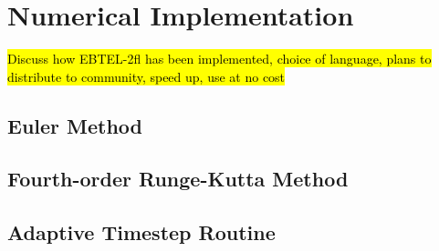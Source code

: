 \section{Numerical Implementation}
\label{sec:numerical}
%
\hl{Discuss how EBTEL-2fl has been implemented, choice of language, plans to distribute to community, speed up, use at no cost}
%
\subsection{Euler Method}
\label{subsec:euler}
%
\subsection{Fourth-order Runge-Kutta Method}
\label{subsec:rk4}
%
\subsection{Adaptive Timestep Routine}
\label{subsec:adapt}
%